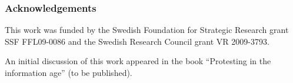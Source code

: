 \subsubsection*{Acknowledgements}

This work was funded by the Swedish Foundation for Strategic Research grant SSF 
FFL09-0086 and the Swedish Research Council grant VR 2009-3793.

An initial discussion of this work appeared in the book \enquote{Protesting in
  the information age} (to be published).
